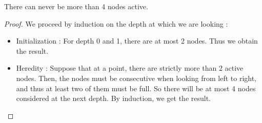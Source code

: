 \documentclass{cours}
\begin{document}
\begin{lemma}
    There can never be more than 4 nodes active.
\end{lemma}
\begin{proof}
    We proceed by induction on the depth at which we are looking :
    \begin{itemize}
        \item Initialization : For depth 0 and 1, there are at most 2 nodes. Thus we obtain the result. 
        \item Heredity : Suppose that at a point, there are strictly more than 2 active nodes. Then, the nodes must be consecutive when looking from left to right, and thus at least two of them must be full. So there will be at most 4 nodes considered at the next depth. By induction, we get the result.  
    \end{itemize}
\end{proof}
\end{document}
